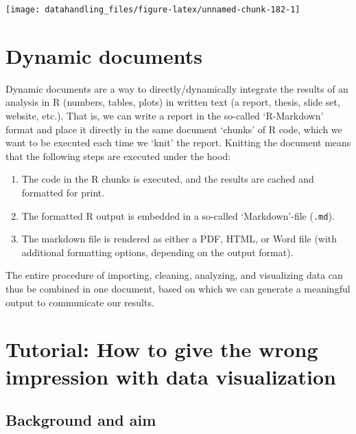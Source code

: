 \documentclass[
  12pt,
]{style/krantz}
\providecommand{\tightlist}{%
  \setlength{\itemsep}{0pt}\setlength{\parskip}{0pt}}
\begin{document}
\texttt{[image: datahandling\_files/figure-latex/unnamed-chunk-182-1]}

\hypertarget{dynamic-documents}{%
\section{Dynamic documents}\label{dynamic-documents}}

Dynamic documents are a way to directly/dynamically integrate the results of an analysis in R (numbers, tables, plots) in written text (a report, thesis, slide set, website, etc.). That is, we can write a report in the so-called `R-Markdown' format and place it directly in the same document `chunks' of R code, which we want to be executed each time we `knit' the report. Knitting the document means that the following steps are executed under the hood:

\begin{enumerate}
\def\labelenumi{\arabic{enumi}.}
\tightlist
\item
  The code in the R chunks is executed, and the results are cached and formatted for print.
\item
  The formatted R output is embedded in a so-called `Markdown'-file (\texttt{.md}).
\item
  The markdown file is rendered as either a PDF, HTML, or Word file (with additional formatting options, depending on the output format).
\end{enumerate}

The entire procedure of importing, cleaning, analyzing, and visualizing data can thus be combined in one document, based on which we can generate a meaningful output to communicate our results.

\hypertarget{tutorial-how-to-give-the-wrong-impression-with-data-visualization}{%
\section{Tutorial: How to give the wrong impression with data visualization}\label{tutorial-how-to-give-the-wrong-impression-with-data-visualization}}

\hypertarget{background-and-aim}{%
\subsection{Background and aim}\label{background-and-aim}}
\end{document}
